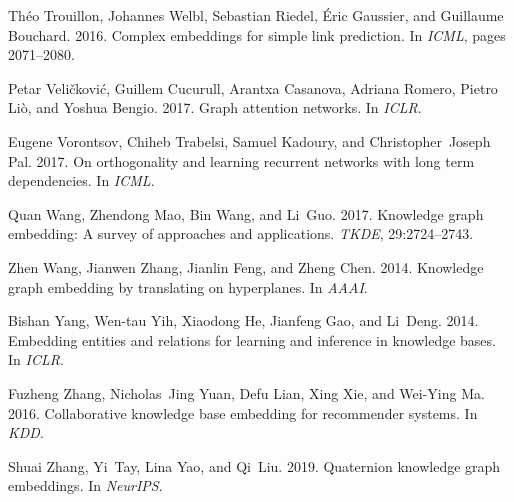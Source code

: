 \documentclass[11pt,a4paper]{article}
\begin{document}
\begin{thebibliography}{34}
Th{\'e}o Trouillon, Johannes Welbl, Sebastian Riedel, {\'E}ric Gaussier, and
  Guillaume Bouchard. 2016.
\newblock Complex embeddings for simple link prediction.
\newblock In \emph{ICML}, pages 2071--2080.

Petar Veli{\v{c}}kovi{\'c}, Guillem Cucurull, Arantxa Casanova, Adriana Romero,
  Pietro Li{\`o}, and Yoshua Bengio. 2017.
\newblock Graph attention networks.
\newblock In \emph{ICLR}.

Eugene Vorontsov, Chiheb Trabelsi, Samuel Kadoury, and Christopher~Joseph Pal.
  2017.
\newblock On orthogonality and learning recurrent networks with long term
  dependencies.
\newblock In \emph{ICML}.

Quan Wang, Zhendong Mao, Bin Wang, and Li~Guo. 2017.
\newblock Knowledge graph embedding: A survey of approaches and applications.
\newblock \emph{TKDE}, 29:2724--2743.

Zhen Wang, Jianwen Zhang, Jianlin Feng, and Zheng Chen. 2014.
\newblock Knowledge graph embedding by translating on hyperplanes.
\newblock In \emph{AAAI}.

Bishan Yang, Wen-tau Yih, Xiaodong He, Jianfeng Gao, and Li~Deng. 2014.
\newblock Embedding entities and relations for learning and inference in
  knowledge bases.
\newblock In \emph{ICLR}.

Fuzheng Zhang, Nicholas~Jing Yuan, Defu Lian, Xing Xie, and Wei-Ying Ma. 2016.
\newblock Collaborative knowledge base embedding for recommender systems.
\newblock In \emph{KDD}.

Shuai Zhang, Yi~Tay, Lina Yao, and Qi~Liu. 2019.
\newblock Quaternion knowledge graph embeddings.
\newblock In \emph{NeurIPS}.

\end{thebibliography}
\end{document}
